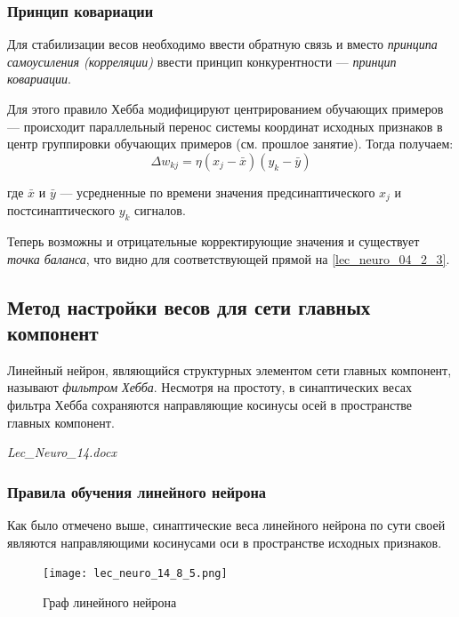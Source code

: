 \documentclass[a4paper]{article}
\numberwithin{equation}{subsection}
\begin{document}
\subsubsection{Принцип ковариации}

Для стабилизации весов необходимо ввести обратную связь и вместо \textit{принципа 
самоусиления (корреляции)} ввести принцип конкурентности --- \textit{принцип ковариации}.

Для этого правило Хебба модифицируют центрированием обучающих примеров --- происходит параллельный 
перенос системы координат исходных признаков в центр группировки обучающих примеров 
(см. прошлое занятие). Тогда получаем:
\begin{equation}
    \Delta w_{kj} = \eta \left( x_j - \bar{x} \right) \left( y_k - \bar{y} \right)
\end{equation}

\noindent
где $\bar{x}$ и $\bar{y}$ --- усредненные по времени значения предсинаптического $x_j$ 
и постсинаптического $y_k$ сигналов.

Теперь возможны и отрицательные корректирующие значения и существует \textit{точка баланса},
что видно для соответствующей прямой на \ref{lec_neuro_04_2_3}. 




\subsection{Метод настройки весов для сети главных компонент}

Линейный нейрон, являющийся структурных элементом сети главных компонент, называют 
\textit{фильтром Хебба}.
Несмотря на простоту, в синаптических весах фильтра Хебба сохраняются 
направляющие косинусы осей в пространстве главных компонент.

\begin{myquote}
    \textit{Lec\_Neuro\_14.docx}
\end{myquote}



\subsubsection{Правила обучения линейного нейрона}

Как было отмечено выше, синаптические веса линейного нейрона по сути своей являются 
направляющими косинусами оси в пространстве исходных признаков.

\begin{figure}[htbp]
    \centering
    \texttt{[image: lec\_neuro\_14\_8\_5.png]}
    \caption{Граф линейного нейрона}
    \label{lec_neuro_14_8_5}
\end{figure}
\end{document}
